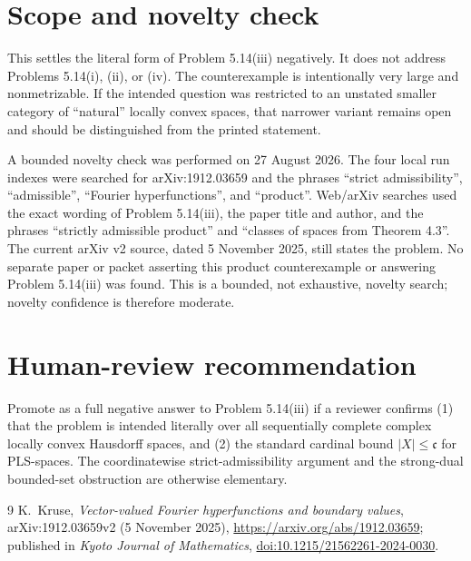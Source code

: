 \documentclass[11pt]{article}
\newcommand{\cC}{\mathfrak c}
\begin{document}
\section{Scope and novelty check}

This settles the literal form of Problem 5.14(iii) negatively.  It does not
address Problems 5.14(i), (ii), or (iv).  The counterexample is intentionally
very large and nonmetrizable.  If the intended question was restricted to an
unstated smaller category of ``natural'' locally convex spaces, that narrower
variant remains open and should be distinguished from the printed statement.

A bounded novelty check was performed on 27 August 2026.  The four local run
indexes were searched for arXiv:1912.03659 and the phrases ``strict
admissibility'', ``admissible'', ``Fourier hyperfunctions'', and ``product''.
Web/arXiv searches used the exact wording of Problem 5.14(iii), the paper title
and author, and the phrases ``strictly admissible product'' and ``classes of
spaces from Theorem 4.3''.  The current arXiv v2 source, dated 5 November 2025,
still states the problem.  No separate paper or packet asserting this product
counterexample or answering Problem 5.14(iii) was found.  This is a bounded,
not exhaustive, novelty search; novelty confidence is therefore moderate.

\section{Human-review recommendation}

Promote as a full negative answer to Problem 5.14(iii) if a reviewer confirms
(1) that the problem is intended literally over all sequentially complete
complex locally convex Hausdorff spaces, and (2) the standard cardinal bound
$|X|\leq\cC$ for PLS-spaces.  The coordinatewise strict-admissibility argument
and the strong-dual bounded-set obstruction are otherwise elementary.

\begin{thebibliography}{9}
K.~Kruse,
\emph{Vector-valued Fourier hyperfunctions and boundary values},
arXiv:1912.03659v2 (5 November 2025),
\url{https://arxiv.org/abs/1912.03659};
published in \emph{Kyoto Journal of Mathematics},
\href{https://doi.org/10.1215/21562261-2024-0030}{doi:10.1215/21562261-2024-0030}.
\end{thebibliography}
\end{document}

